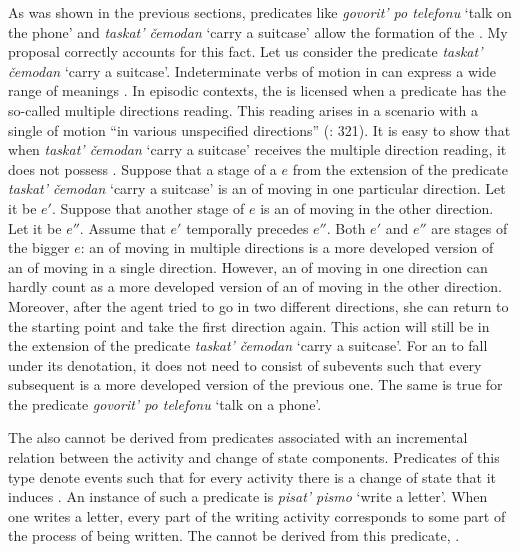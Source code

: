 \documentclass[output=paper,colorlinks,citecolor=brown,newtxmath]{langsci/langscibook}
\begin{document}
As was shown in the previous sections, predicates like \textit{govorit’ po telefonu} `talk on the phone' and \textit{taskat’ čemodan} `carry a suitcase' allow the formation of the . My proposal correctly accounts for this fact. Let us consider the predicate \textit{taskat’ čemodan} `carry a suitcase'. Indeterminate verbs of motion in  can express a wide range of meanings \citep{forsyth1970grammar}. In episodic contexts, the  is licensed when a predicate has the so-called multiple directions reading. This reading arises in a scenario with a single  of motion ``in various unspecified directions'' (\citealt{forsyth1970grammar}: 321). It is easy to show that when \textit{taskat’ čemodan} `carry a suitcase' receives the multiple direction reading, it does not possess . Suppose that a stage of a  $e$ from the extension of the predicate \textit{taskat’ čemodan} `carry a suitcase' is an  of moving in one particular direction. Let it be $e'$. Suppose that another stage of $e$ is an  of moving in the other direction. Let it be $e''$. Assume that $e'$ temporally precedes $e''$. Both $e'$ and $e''$ are stages of the bigger  $e$: an  of moving in multiple directions is a more developed version of an  of moving in a single direction. However, an  of moving in one direction can hardly count as a more developed version of an  of moving in the other direction. Moreover, after the agent tried to go in two different directions, she can return to the starting point and take the first direction again. This action will still be in the extension of the predicate \textit{taskat’ čemodan} `carry a suitcase'. For an  to fall under its denotation, it does not need to consist of subevents such that every subsequent  is a more developed version of the previous one. The same is true for the predicate \textit{govorit’ po telefonu} `talk on a phone'.

\largerpage
The  also cannot be derived from predicates associated with an incremental relation between the activity and change of state components. Predicates of this type denote events such that for every activity  there is a change of state that it induces \citep{rothstein2004structuring}. An instance of such a predicate is \textit{pisat’ pismo} `write a letter'. When one writes a letter, every part of the writing activity corresponds to some part of the process of being written. The  cannot be derived from this predicate, .
\end{document}
